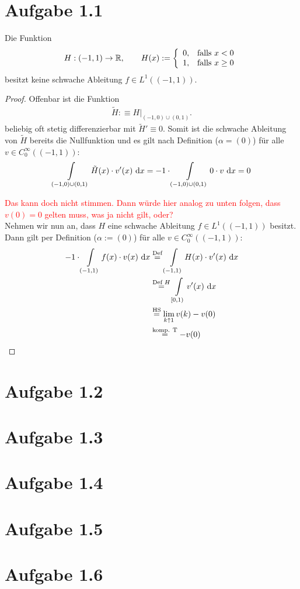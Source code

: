 \documentclass[12pt,a4paper]{article}
\author{Willi Sontopski}
\begin{document}

\section*{Aufgabe 1.1}
Die Funktion
\begin{align*}
H:(-1,1)\to\mathbb{R},\qquad H(x):=\left\lbrace\begin{array}{cl}
0, & \text{falls } x<0\\
1, & \text{falls } x\geq0
\end{array}\right.
\end{align*}
besitzt keine schwache Ableitung $f\in L^1((-1,1))$.
\begin{proof}
Offenbar ist die Funktion
\begin{align*}
\tilde{H}:\equiv H|_{(-1,0)\cup(0,1)}.
\end{align*}
beliebig oft stetig differenzierbar mit $\tilde{H}'\equiv0$. Somit ist die schwache Ableitung von $\tilde{H}$ bereits die Nullfunktion und es gilt nach Definition ($\alpha=(0)$) für alle $v\in C_0^\infty((-1,1))$:
\begin{align*}
\int\limits_{(-1,0)\cup(0,1)}\tilde{H}(x)\cdot v'(x)\text{ d} x=-1\cdot\int\limits_{(-1,0)\cup(0,1)} 0\cdot v\text{ d} x=0
\end{align*}

\textcolor{red}{Das kann doch nicht stimmen. Dann würde hier analog zu unten folgen, dass $v(0)=0$ gelten muss, was ja nicht gilt, oder?}\\

Nehmen wir nun an, dass $H$ eine schwache Ableitung $f\in L^1((-1,1))$ besitzt. Dann gilt per Definition ($\alpha:=(0)$) für alle $v\in C_0^\infty((-1,1))$:
\begin{align*}
-1\cdot\int\limits_{(-1,1)} f(x)\cdot v(x)\text{ d} x
&\stackrel{\text{Def}}{=}
\int\limits_{(-1,1)} H(x)\cdot v'(x)\text{ d} x\\
&\stackrel{\text{Def }H}{=}
\int\limits_{[0,1)} v'(x)\text{ d} x\\
&\stackrel{\text{HS}}{=}
\lim\limits_{k\uparrow 1} v(k)-v(0)\\
&\stackrel{\text{komp. T}}{=}
-v(0)
\end{align*}
\end{proof}

\section*{Aufgabe 1.2}

\section*{Aufgabe 1.3}


\section*{Aufgabe 1.4}


\section*{Aufgabe 1.5}

\section*{Aufgabe 1.6}
\end{document}
